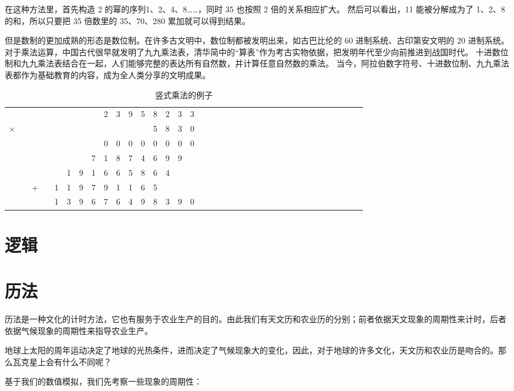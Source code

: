 \documentclass[a4paper,10.5pt]{book}
\begin{document}
在这种方法里，首先构造 2 的幂的序列1、2、4、8……，同时 35 也按照 2 倍的关系相应扩大。
然后可以看出，11 能被分解成为了 1、2、8 的和，所以只要把 35 倍数里的 35、70、280 累加就可以得到结果。

但是数制的更加成熟的形态是数位制。在许多古文明中，数位制都被发明出来，如古巴比伦的 60 进制系统、古印第安文明的 20 进制系统。
对于乘法运算，中国古代很早就发明了九九乘法表，清华简中的“算表”作为考古实物依据，把发明年代至少向前推进到战国时代。
十进数位制和九九乘法表结合在一起，人们能够完整的表达所有自然数，并计算任意自然数的乘法。
当今，阿拉伯数字符号、十进数位制、九九乘法表都作为基础教育的内容，成为全人类分享的文明成果。

\begin{table}[tbhp]
\centering
\begin{tabular}{cccccccccccccccccccccccccccccccccccc}
  &   &   &   &   &   &   &   & 2 & 3 & 9 & 5 & 8 & 2 & 3 & 3\\
× &   &   &   &   &   &   &   &   &   &   &   & 5 & 8 & 3 & 0\\
\hline
  &   &   &   &   &   &   &   & 0 & 0 & 0 & 0 & 0 & 0 & 0 & 0\\
  &   &   &   &   &   &   & 7 & 1 & 8 & 7 & 4 & 6 & 9 & 9 &  \\
  &   &   &   &   & 1 & 9 & 1 & 6 & 6 & 5 & 8 & 6 & 4 &   &  \\
  &   & + &   & 1 & 1 & 9 & 7 & 9 & 1 & 1 & 6 & 5 &   &   &  \\
\hline
  &   &   &   & 1 & 3 & 9 & 6 & 7 & 6 & 4 & 9 & 8 & 3 & 9 & 0\\
\end{tabular}
\caption{竖式乘法的例子}
\end{table}

\section{逻辑}

\section{历法}

历法是一种文化的计时方法，它也有服务于农业生产的目的。由此我们有天文历和农业历的分别；前者依据天文现象的周期性来计时，后者依据气候现象的周期性来指导农业生产。

地球上太阳的周年运动决定了地球的光热条件，进而决定了气候现象大的变化，因此，对于地球的许多文化，天文历和农业历是吻合的。那么瓦克星上会有什么不同呢？

基于我们的数值模拟，我们先考察一些现象的周期性：
\end{document}
